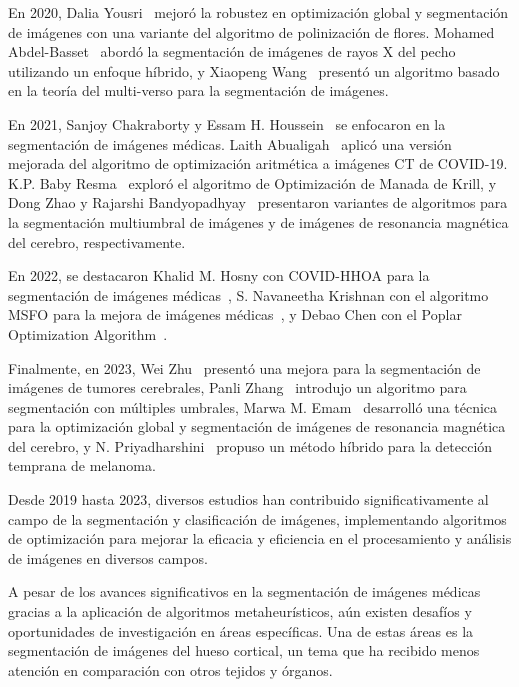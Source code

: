 \documentclass[conference]{IEEEtran}
\begin{document}
\noindent En 2020, Dalia Yousri~\cite{Yousri2020} mejoró la robustez en optimización global y segmentación de imágenes con una variante del algoritmo de polinización de flores. Mohamed Abdel-Basset~\cite{AbdelBasset2020} abordó la segmentación de imágenes de rayos X del pecho utilizando un enfoque híbrido, y Xiaopeng Wang~\cite{Wang2020} presentó un algoritmo basado en la teoría del multi-verso para la segmentación de imágenes.

\noindent En 2021, Sanjoy Chakraborty y Essam H. Houssein~\cite{Chakraborty2021, Houssein2021} se enfocaron en la segmentación de imágenes médicas. Laith Abualigah~\cite{Abualigah2021} aplicó una versión mejorada del algoritmo de optimización aritmética a imágenes CT de COVID-19. K.P. Baby Resma~\cite{BabyResma2021} exploró el algoritmo de Optimización de Manada de Krill, y Dong Zhao y Rajarshi Bandyopadhyay~\cite{Zhao2021, Bandyopadhyay2021} presentaron variantes de algoritmos para la segmentación multiumbral de imágenes y de imágenes de resonancia magnética del cerebro, respectivamente.

\noindent En 2022, se destacaron Khalid M. Hosny con COVID-HHOA para la segmentación de imágenes médicas~\cite{Hosny2022}, S. Navaneetha Krishnan con el algoritmo MSFO para la mejora de imágenes médicas~\cite{NavaneethaKrishnan2022}, y Debao Chen con el Poplar Optimization Algorithm~\cite{Chen2022}.

\noindent Finalmente, en 2023, Wei Zhu~\cite{Zhu2023} presentó una mejora para la segmentación de imágenes de tumores cerebrales, Panli Zhang~\cite{Zhang2023} introdujo un algoritmo para segmentación con múltiples umbrales, Marwa M. Emam~\cite{Emam2023} desarrolló una técnica para la optimización global y segmentación de imágenes de resonancia magnética del cerebro, y N. Priyadharshini~\cite{Priyadharshini2023} propuso un método híbrido para la detección temprana de melanoma.

\noindent Desde 2019 hasta 2023, diversos estudios han contribuido significativamente al campo de la segmentación y clasificación de imágenes, implementando algoritmos de optimización para mejorar la eficacia y eficiencia en el procesamiento y análisis de imágenes en diversos campos.

\noindent A pesar de los avances significativos en la segmentación de imágenes médicas gracias a la aplicación de algoritmos metaheurísticos, aún existen desafíos y oportunidades de investigación en áreas específicas. Una de estas áreas es la segmentación de imágenes del hueso cortical, un tema que ha recibido menos atención en comparación con otros tejidos y órganos. 
\end{document}

